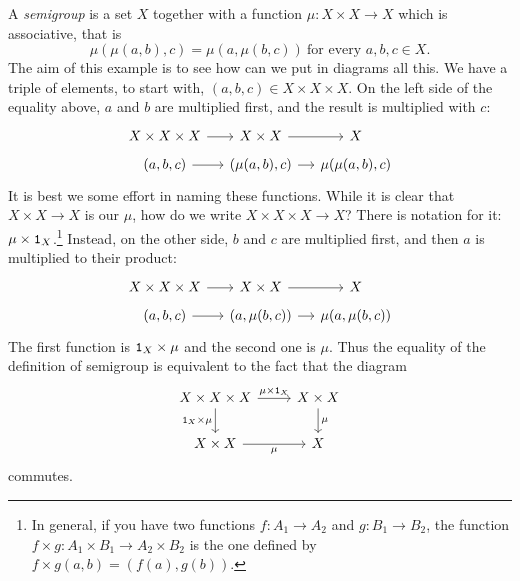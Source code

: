 \begin{example}
  A {\em semigroup} is a set \(X\) together with a function
  \(\mu : X \times X \to X\) which is associative, that is
  \[\mu(\mu(a, b), c) = \mu(a, \mu(b, c)) \ \text{for every } a, b, c
    \in X .\] The aim of this example is to see how can we put in
  diagrams all this. We have a triple of elements, to start with,
  \((a, b, c) \in X \times X \times X\). On the left side of the equality above,
  \(a\) and \(b\) are multiplied first, and the result is multiplied
  with \(c\):
  \[\begin{tikzcd}[row sep=tiny, column sep=small]
      X \times X \times X \ar[r] & X \times X \ar[r] & X \\
      (a, b, c) \ar[r] & (\mu(a, b), c) \ar[r] & \mu(\mu(a, b), c)
    \end{tikzcd}\] It is best we some effort in naming these
  functions. While it is clear that \(X \times X \to X\) is our
  \(\mu\), how do we write \(X \times X \times X \to X\)? There is notation for it:
  \(\mu \times \mathtt 1_X\).\footnote{In general, if you have two functions
    \(f : A_1 \to A_2\) and \(g : B_1 \to B_2\), the function
    \(f \times g : A_1 \times B_1 \to A_2 \times B_2\) is the one defined by
    \(f \times g (a, b) = (f(a), g(b))\).} Instead, on the other side,
  \(b\) and \(c\) are multiplied first, and then \(a\) is multiplied
  to their product:
  \[\begin{tikzcd}[row sep=tiny, column sep=small]
      X \times X \times X \ar[r] & X \times X \ar[r] & X \\
      (a, b, c) \ar[r] & (a, \mu(b, c)) \ar[r] & \mu(a, \mu(b, c))
    \end{tikzcd}\] The first function is \(\mathtt 1_X \times \mu\) and the second
  one is \(\mu\). Thus the equality of the definition of semigroup is
  equivalent to the fact that the diagram
  \[\begin{tikzcd}
      X \times X \times X \ar["{\mu \times \id_X}", r] \ar["{\id_X \times \mu}", d, swap] & X \times X \ar["\mu", d] \\
      X \times X \ar["\mu", r, swap] & X
    \end{tikzcd}\] commutes.
\end{example}

